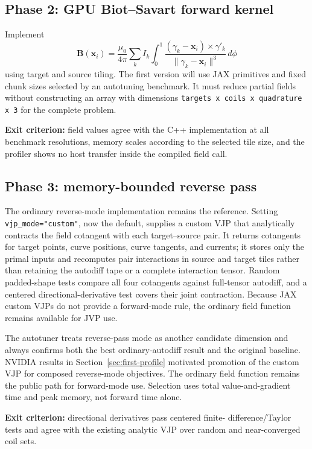 \documentclass[11pt,a4paper]{article}
\newcommand{\code}[1]{\texttt{#1}}
\begin{document}
\subsection{Phase 2: GPU Biot--Savart forward kernel}

Implement
\[
 \mathbf B(\mathbf x_i)=\frac{\mu_0}{4\pi}
 \sum_k I_k\int_0^1
 \frac{(\gamma_k-\mathbf x_i)\times\gamma'_k}
      {\lVert\gamma_k-\mathbf x_i\rVert^3}\,d\phi
\]
using target and source tiling.  The first version will use JAX primitives and
fixed chunk sizes selected by an autotuning benchmark.  It must reduce partial
fields without constructing an array with dimensions
\code{targets x coils x quadrature x 3} for the complete problem.

\textbf{Exit criterion:} field values agree with the C++ implementation at all
benchmark resolutions, memory scales according to the selected tile size, and
the profiler shows no host transfer inside the compiled field call.

\subsection{Phase 3: memory-bounded reverse pass}

The ordinary reverse-mode implementation remains the reference.  Setting
\code{vjp\_mode="custom"}, now the default, supplies a custom VJP that
analytically contracts the field cotangent with each target--source pair.  It
returns cotangents for target points, curve positions, curve tangents, and
currents; it stores only the primal inputs and recomputes pair interactions in
source and target tiles rather than retaining the autodiff tape or a complete
interaction tensor.  Random padded-shape tests compare all four cotangents
against full-tensor autodiff, and a centered directional-derivative test covers
their joint contraction.  Because JAX custom VJPs do not provide a forward-mode
rule, the ordinary field function remains available for JVP use.

The autotuner treats reverse-pass mode as another candidate dimension and
always confirms both the best ordinary-autodiff result and the original
baseline.  NVIDIA results in Section~\ref{sec:first-profile} motivated promotion
of the custom VJP for composed reverse-mode objectives.  The ordinary field
function remains the public path for forward-mode use.  Selection uses total
value-and-gradient time and peak memory, not forward time alone.

\textbf{Exit criterion:} directional derivatives pass centered finite-
difference/Taylor tests and agree with the existing analytic VJP over random and
near-converged coil sets.
\end{document}
